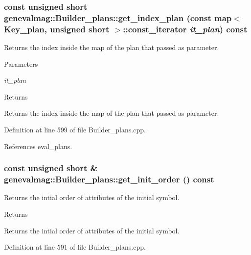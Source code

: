 \hypertarget{classgenevalmag_1_1Builder__plans_a7748b68109c6c6aa805bbd1886dd6029}{
\subsubsection[{get\_\-index\_\-plan}]{\setlength{\rightskip}{0pt plus 5cm}const unsigned short genevalmag::Builder\_\-plans::get\_\-index\_\-plan (const map$<$ {\bf Key\_\-plan}, unsigned short $>$::const\_\-iterator {\em it\_\-plan}) const}}
\label{classgenevalmag_1_1Builder__plans_a7748b68109c6c6aa805bbd1886dd6029}
Returns the index inside the map of the plan that passed as parameter. 
\begin{DoxyParams}{Parameters}
\item[{\em it\_\-plan}]\end{DoxyParams}
\begin{DoxyReturn}{Returns}

\end{DoxyReturn}
Returns the index inside the map of the plan that passed as parameter. 

Definition at line 599 of file Builder\_\-plans.cpp.



References eval\_\-plans.

\hypertarget{classgenevalmag_1_1Builder__plans_a52157d41e3998900e61ab90eda9e4e91}{
\subsubsection[{get\_\-init\_\-order}]{\setlength{\rightskip}{0pt plus 5cm}const unsigned short \& genevalmag::Builder\_\-plans::get\_\-init\_\-order () const}}
\label{classgenevalmag_1_1Builder__plans_a52157d41e3998900e61ab90eda9e4e91}
Returns the intial order of attributes of the initial symbol. \begin{DoxyReturn}{Returns}

\end{DoxyReturn}
Returns the intial order of attributes of the initial symbol. 

Definition at line 591 of file Builder\_\-plans.cpp.



